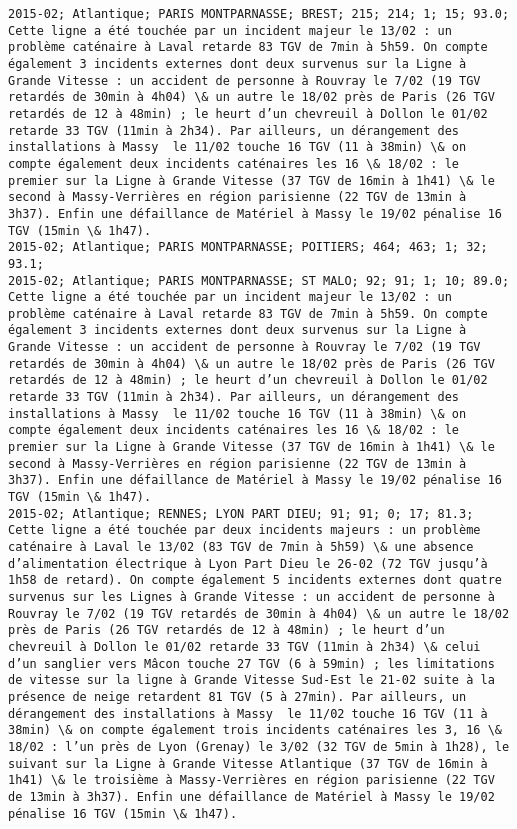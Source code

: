 \documentclass{article}
\begin{document}
\begin{Verbatim}[commandchars=\\\{\}]
2015-02; Atlantique; PARIS MONTPARNASSE; BREST; 215; 214; 1; 15; 93.0; Cette ligne a été touchée par un incident majeur le 13/02 : un problème caténaire à Laval retarde 83 TGV de 7min à 5h59. On compte également 3 incidents externes dont deux survenus sur la Ligne à Grande Vitesse : un accident de personne à Rouvray le 7/02 (19 TGV retardés de 30min à 4h04) \& un autre le 18/02 près de Paris (26 TGV retardés de 12 à 48min) ; le heurt d’un chevreuil à Dollon le 01/02 retarde 33 TGV (11min à 2h34). Par ailleurs, un dérangement des installations à Massy  le 11/02 touche 16 TGV (11 à 38min) \& on compte également deux incidents caténaires les 16 \& 18/02 : le premier sur la Ligne à Grande Vitesse (37 TGV de 16min à 1h41) \& le second à Massy-Verrières en région parisienne (22 TGV de 13min à 3h37). Enfin une défaillance de Matériel à Massy le 19/02 pénalise 16 TGV (15min \& 1h47).
2015-02; Atlantique; PARIS MONTPARNASSE; POITIERS; 464; 463; 1; 32; 93.1; 
2015-02; Atlantique; PARIS MONTPARNASSE; ST MALO; 92; 91; 1; 10; 89.0; Cette ligne a été touchée par un incident majeur le 13/02 : un problème caténaire à Laval retarde 83 TGV de 7min à 5h59. On compte également 3 incidents externes dont deux survenus sur la Ligne à Grande Vitesse : un accident de personne à Rouvray le 7/02 (19 TGV retardés de 30min à 4h04) \& un autre le 18/02 près de Paris (26 TGV retardés de 12 à 48min) ; le heurt d’un chevreuil à Dollon le 01/02 retarde 33 TGV (11min à 2h34). Par ailleurs, un dérangement des installations à Massy  le 11/02 touche 16 TGV (11 à 38min) \& on compte également deux incidents caténaires les 16 \& 18/02 : le premier sur la Ligne à Grande Vitesse (37 TGV de 16min à 1h41) \& le second à Massy-Verrières en région parisienne (22 TGV de 13min à 3h37). Enfin une défaillance de Matériel à Massy le 19/02 pénalise 16 TGV (15min \& 1h47).
2015-02; Atlantique; RENNES; LYON PART DIEU; 91; 91; 0; 17; 81.3; Cette ligne a été touchée par deux incidents majeurs : un problème caténaire à Laval le 13/02 (83 TGV de 7min à 5h59) \& une absence d’alimentation électrique à Lyon Part Dieu le 26-02 (72 TGV jusqu’à 1h58 de retard). On compte également 5 incidents externes dont quatre survenus sur les Lignes à Grande Vitesse : un accident de personne à Rouvray le 7/02 (19 TGV retardés de 30min à 4h04) \& un autre le 18/02 près de Paris (26 TGV retardés de 12 à 48min) ; le heurt d’un chevreuil à Dollon le 01/02 retarde 33 TGV (11min à 2h34) \& celui d’un sanglier vers Mâcon touche 27 TGV (6 à 59min) ; les limitations de vitesse sur la ligne à Grande Vitesse Sud-Est le 21-02 suite à la présence de neige retardent 81 TGV (5 à 27min). Par ailleurs, un dérangement des installations à Massy  le 11/02 touche 16 TGV (11 à 38min) \& on compte également trois incidents caténaires les 3, 16 \& 18/02 : l’un près de Lyon (Grenay) le 3/02 (32 TGV de 5min à 1h28), le suivant sur la Ligne à Grande Vitesse Atlantique (37 TGV de 16min à 1h41) \& le troisième à Massy-Verrières en région parisienne (22 TGV de 13min à 3h37). Enfin une défaillance de Matériel à Massy le 19/02 pénalise 16 TGV (15min \& 1h47). 

\end{Verbatim}
\end{document}
